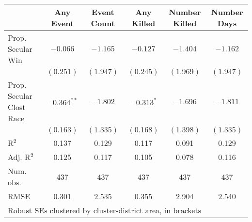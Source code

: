 
\begin{tabular}{l c c c c c }
\hline
 & Any Event & Event Count & Any Killed & Number Killed & Number Days \\
\hline
Prop. Secular Win        & $-0.066$      & $-1.165$  & $-0.127$     & $-1.404$  & $-1.162$  \\
                         & $(0.251)$     & $(1.947)$ & $(0.245)$    & $(1.969)$ & $(1.947)$ \\
Prop. Secular Clost Race & $-0.364^{**}$ & $-1.802$  & $-0.313^{*}$ & $-1.696$  & $-1.811$  \\
                         & $(0.163)$     & $(1.335)$ & $(0.168)$    & $(1.398)$ & $(1.335)$ \\
\hline
R$^2$                    & 0.137         & 0.129     & 0.117        & 0.091     & 0.129     \\
Adj. R$^2$               & 0.125         & 0.117     & 0.105        & 0.078     & 0.116     \\
Num. obs.                & 437           & 437       & 437          & 437       & 437       \\
RMSE                     & 0.301         & 2.535     & 0.355        & 2.904     & 2.540     \\
\hline
\multicolumn{6}{l}{\scriptsize{Robust SEs clustered by cluster-district area, in brackets}}
\end{tabular}
